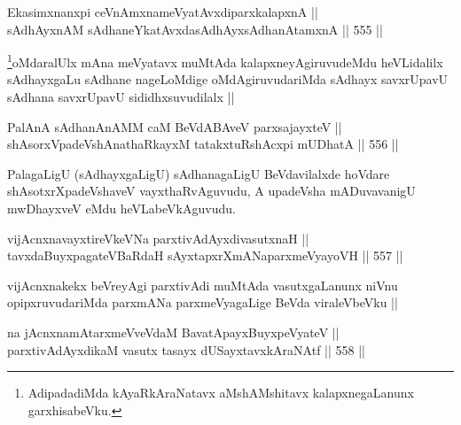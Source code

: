 
\begin{shl}
Ekasimxnanxpi ceVnAmxnameVyatAvxdiparxkalapxnA || \\
sAdhAyxnAM sAdhaneYkatAvxdasAdhAyxsAdhanAtamxnA ||  555 ||  
\end{shl}

\begin{artha}
\footnote{AdipadadiMda kAyaRkAraNatavx aMshAMshitavx kalapxnegaLanunx garxhisabeVku.}oMdaralUlx mAna meVyatavx muMtAda kalapxneyAgiruvudeMdu heVLidalilx sAdhayxgaLu sAdhane nageLoMdige oMdAgiruvudariMda sAdhayx savxrUpavU sAdhana savxrUpavU sididhxsuvudilalx ||
\end{artha}


\begin{shl}
PalAnA sAdhanAnAMM caM BeVdABAveV parxsajayxteV || \\
shAsorxVpadeVshAnathaRkayxM tatakxtuRshAcxpi mUDhatA ||  556 ||  
\end{shl}

\begin{artha}
PalagaLigU (sAdhayxgaLigU) sAdhanagaLigU BeVdavilalxde hoVdare shAsotxrXpadeVshaveV vayxthaRvAguvudu, A upadeVsha mADuvavanigU mwDhayxveV eMdu heVLabeVkAguvudu.
\end{artha}


\begin{shl}
vijAcnxnavayxtireVkeVNa parxtivAdAyxdivasutxnaH || \\
tavxdaBuyxpagateVBaRdaH sAyxtapxrXmANaparxmeVyayoVH ||  557 || 
\end{shl}

\begin{artha}
vijAcnxnakekx beVreyAgi parxtivAdi muMtAda vasutxgaLanunx niVnu opipxruvudariMda parxmANa parxmeVyagaLige BeVda viraleVbeVku || 
\end{artha}


\begin{shl}
na jAcnxnamAtarxmeVveVdaM BavatA\s payxBuyxpeVyateV || \\
parxtivAdAyxdikaM vasutx tasayx dUSayxtavxkAraNAtf ||  558 ||  
\end{shl}

